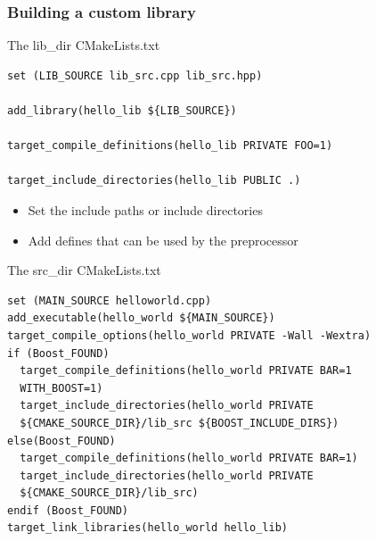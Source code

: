 \begin{frame}[fragile]
  \frametitle{Building a custom library}
  \begin{block}{The lib\_dir CMakeLists.txt}
\begin{verbatim}
set (LIB_SOURCE lib_src.cpp lib_src.hpp)

add_library(hello_lib ${LIB_SOURCE}) 

target_compile_definitions(hello_lib PRIVATE FOO=1)

target_include_directories(hello_lib PUBLIC .)
\end{verbatim}
  \end{block}

\begin{itemize}
  \item Set the include paths or include directories
  \item Add defines that can be used by the preprocessor 
\end{itemize}
  
\end{frame}

\begin{frame}[fragile]
\begin{block}{The src\_dir CMakeLists.txt}
\begin{verbatim}
set (MAIN_SOURCE helloworld.cpp)
add_executable(hello_world ${MAIN_SOURCE})
target_compile_options(hello_world PRIVATE -Wall -Wextra)
if (Boost_FOUND)
  target_compile_definitions(hello_world PRIVATE BAR=1 
  WITH_BOOST=1)
  target_include_directories(hello_world PRIVATE 
  ${CMAKE_SOURCE_DIR}/lib_src ${BOOST_INCLUDE_DIRS})
else(Boost_FOUND)
  target_compile_definitions(hello_world PRIVATE BAR=1)
  target_include_directories(hello_world PRIVATE 
  ${CMAKE_SOURCE_DIR}/lib_src)
endif (Boost_FOUND)
target_link_libraries(hello_world hello_lib)
\end{verbatim}
\end{block}

\end{frame}


